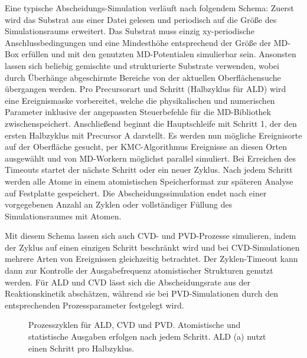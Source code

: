 Eine typische Abscheidungs-Simulation verläuft nach folgendem Schema:
Zuerst wird das Substrat aus einer Datei gelesen und periodisch auf die Größe des Simulationsraums erweitert.
Das Substrat muss einzig xy-periodische Anschlussbedingungen und eine Mindesthöhe entsprechend der Größe der MD-Box erfüllen und mit den genutzten MD-Potentialen simulierbar sein.
Ansonsten lassen sich beliebig gemischte und strukturierte Substrate verwenden, wobei durch Überhänge abgeschirmte Bereiche von der aktuellen Oberflächensuche übergangen werden.
Pro Precursorart und Schritt (Halbzyklus für ALD) wird eine Ereignismaske vorbereitet, welche die physikalischen und numerischen Parameter inklusive der angepassten Steuerbefehle für die MD-Bibliothek zwischenspeichert.
Anschließend beginnt die Hauptschleife mit Schritt 1, der den ersten Halbzyklus mit Precursor A darstellt.
Es werden nun mögliche Ereignisorte auf der Oberfläche gesucht, per KMC-Algorithmus Ereignisse an diesen Orten ausgewählt und von MD-Workern möglichst parallel simuliert.
Bei Erreichen des Timeouts startet der nächste Schritt oder ein neuer Zyklus.
Nach jedem Schritt werden alle Atome in einem atomistischen Speicherformat zur späteren Analyse auf Festplatte gespeichert.
Die Abscheidungssimulation endet nach einer vorgegebenen Anzahl an Zyklen oder vollständiger Füllung des Simulationsraumes mit Atomen.

Mit diesem Schema lassen sich auch CVD- und PVD-Prozesse simulieren, indem der Zyklus auf einen einzigen Schritt beschränkt wird und bei CVD-Simulationen mehrere Arten von Ereignissen gleichzeitig betrachtet.
Der Zyklen-Timeout kann dann zur Kontrolle der Ausgabefrequenz atomistischer Strukturen genutzt werden.
Für ALD und CVD lässt sich die Abscheidungsrate aus der Reaktionskinetik abschätzen, während sie bei PVD-Simulationen durch den entsprechenden Prozessparameter festgelegt wird.

\begin{figure}
  \captionsetup[subfigure]{singlelinecheck=false}
  \begin{subfigure}[t]{5.7cm}
    \def\svgwidth{\textwidth}
    
  \end{subfigure}
  \hfill
  \begin{subfigure}[t]{4.7cm}
    \def\svgwidth{\textwidth}
    
  \end{subfigure}
  \hfill
  \begin{subfigure}[t]{3cm}
    \def\svgwidth{\textwidth}
    
  \end{subfigure}
  \caption[Prozesszyklen für ALD, CVD und PVD]{
    Prozesszyklen für ALD, CVD und PVD.
    Atomistische und statistische Ausgaben erfolgen nach jedem Schritt.
    ALD (a) nutzt einen Schritt pro Halbzyklus.
  }
  \label{fig:parsivald-modes}
\end{figure}

